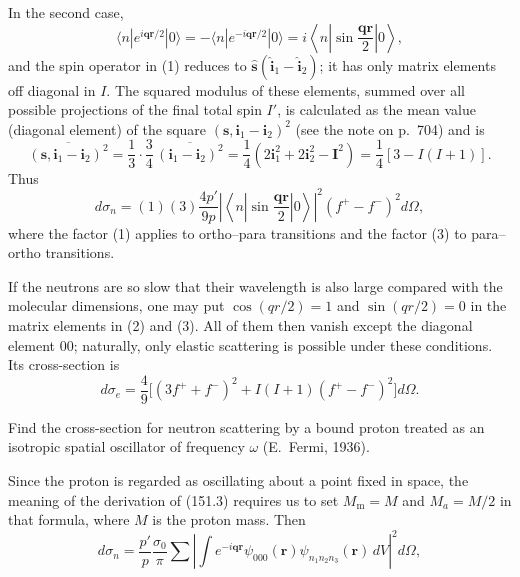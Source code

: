 In the second case,
\[
 \langle n|e^{i\mathbf q\mathbf r/2}|0\rangle
 =-\langle n|e^{-i\mathbf q\mathbf r/2}|0\rangle
 =i\left\langle n\left|\sin\frac{\mathbf q\mathbf r}{2}\right|0\right\rangle,
\]
and the spin operator in (1) reduces to $\hat{\mathbf s}(\hat{\mathbf i}_1-\hat{\mathbf i}_2)$; it has only matrix elements off diagonal in $I$. The squared modulus of these elements, summed over all possible projections of the final total spin $I'$, is calculated as the mean value (diagonal element) of the square $(\mathbf s,\mathbf i_1-\mathbf i_2)^2$ (see the note on p.~704) and is
\[
 \overline{(\mathbf s,\mathbf i_1-\mathbf i_2)^2}
 =\frac13\cdot\frac34\,\overline{(\mathbf i_1-\mathbf i_2)^2}
 =\frac14(2\mathbf i_1^2+2\mathbf i_2^2-\mathbf I^2)
 =\frac14[3-I(I+1)].
\]
Thus
\begin{equation}
 d\sigma_n=(1)(3)\frac{4p'}{9p}
 \left|\left\langle n\left|\sin\frac{\mathbf q\mathbf r}{2}\right|0\right\rangle\right|^2(f^+-f^-)^2d\Omega,
 \tag{3}
\end{equation}
where the factor (1) applies to ortho--para transitions and the factor (3) to para--ortho transitions.

If the neutrons are so slow that their wavelength is also large compared with the molecular dimensions, one may put $\cos(qr/2)=1$ and $\sin(qr/2)=0$ in the matrix elements in (2) and (3). All of them then vanish except the diagonal element 00; naturally, only elastic scattering is possible under these conditions. Its cross-section is
\[
 d\sigma_e=\frac49\big[(3f^++f^-)^2+I(I+1)(f^+-f^-)^2\big]d\Omega.
\]

 Find the cross-section for neutron scattering by a bound proton treated as an isotropic spatial oscillator of frequency $\omega$ (E.~Fermi, 1936).

\SolutionHeading Since the proton is regarded as oscillating about a point fixed in space, the meaning of the derivation of (151.3) requires us to set $M_\text{m}=M$ and $M_a=M/2$ in that formula, where $M$ is the proton mass. Then
\[
 d\sigma_n=\frac{p'}p\frac{\sigma_0}{\pi}\sum
 \left|\int e^{-i\mathbf q\mathbf r}\psi_{000}(\mathbf r)\psi_{n_1n_2n_3}(\mathbf r)\,dV\right|^2d\Omega,
\]

